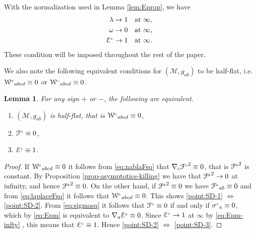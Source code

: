 \documentclass[a4paper,10pt,reqno]{amsart}
\newcommand{\cE}{\mathcal{E}}
\newcommand{\cM}{\mathcal{M}}
\theoremstyle{plain}
\newtheorem{lemma}[thm]{Lemma}
\renewcommand{\P}[1]{{{#1}^{\hspace{-.5pt}\scaleto{+}{4pt}}}}
\newcommand{\M}[1]{{{#1}^{\hspace{-.5pt}\scaleto{-}{4pt}}}}
\newcommand{\PM}[1]{{{#1}^{\hspace{-.5pt}\scaleto{\pm}{3.5pt}}}}
\def\Wcal{\mathcal{W}}
\def\Fcal{\mathcal{F}}
\def\Ecal{\mathcal{E}}
\numberwithin{equation}{section}
\begin{document}
With the normalization used in Lemma \ref{lem:Eprop}, we have 
\begin{subequations} \label{Elamom-infty} 
\begin{align} 
\lambda \to{}& 1 \quad \text{at $\infty$}, \\
\omega \to{}& 0 \quad \text{at $\infty$}, \\
\PM{\cE} \to{}& 1 \quad \text{at $\infty$}. 
\label{eq:Epm-infty} 
\end{align} 
\end{subequations} 
These condition will be imposed throughout the rest of the paper. 



We also note the following equivalent conditions for $(\cM, g_{ab})$ to be half-flat, i.e. $\P{\Wcal}_{abcd} \equiv 0$ or $\M{\Wcal}_{abcd} \equiv 0$.
\begin{lemma} \label{prop:SD-characterizations}
For any sign $+$ or $-$, the following are equivalent. 
\begin{enumerate} 
\item \label{point:SD-1} 
$(\cM, g_{ab})$ is half-flat, that is $\PM{\Wcal}_{abcd} \equiv 0$,
\item \label{point:SD-2} 
$\PM{\Fcal} \equiv 0$, 
\item \label{point:SD-3} 
$\PM{\cE} \equiv 1$.
\end{enumerate}
\end{lemma}

\begin{proof}
If $\PM{\Wcal}_{abcd} \equiv 0$ it follows from \eqref{eq:nablaFsq} that $\nabla_{c}\PM{\Fcal}^2 \equiv 0$, that is $\PM{\Fcal}^2$ is constant. By Proposition \ref{prop-asymptotics-killing} we have that $\PM{\Fcal}^2 \to 0$ at infinity, and hence $\PM{\Fcal}^2 \equiv 0$.
On the other hand, if $\PM{\Fcal}^2 \equiv 0$ we have $\PM{\Fcal}_{ab} \equiv 0$ and from \eqref{eq:laplaceFsq} it follows that $\PM{\Wcal}_{abcd} \equiv 0$. This shows \eqref{point:SD-1} $\Leftrightarrow$ \eqref{point:SD-2}. 
From \eqref{eq:sigmasq} it follows that $\PM{\Fcal} \equiv 0$ if and only if $\PM{\sigma}_{a} \equiv 0$, which by \eqref{eq:Epm} is equivalent to  $\nabla_{a}\PM{\Ecal} \equiv 0$. Since $\PM{\Ecal} \to 1$ at $\infty$ by \eqref{eq:Epm-infty} , this means that $\PM{\Ecal} \equiv 1$. Hence \eqref{point:SD-2} $\Leftrightarrow$ \eqref{point:SD-3}.  
\end{proof}
\end{document}
